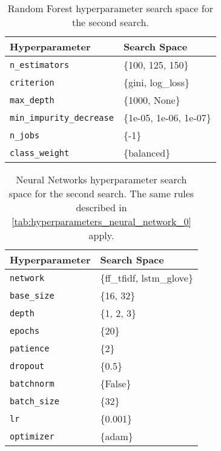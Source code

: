\begin{table}[H]
\centering
\capstart
\begin{tabularx}{0.48\textwidth}{|l|X|}
\hline
Hyperparameter & Search Space \\
\hline
\texttt{n\_estimators} & \{100, 125, 150\} \\
\texttt{criterion} & \{gini, log\_loss\} \\
\texttt{max\_depth} & \{1000, None\} \\
\texttt{min\_impurity\_decrease} & \{1e-05, 1e-06, 1e-07\} \\
\texttt{n\_jobs} & \{-1\} \\
\texttt{class\_weight} & \{balanced\} \\
\hline
\end{tabularx}
\caption{Random Forest hyperparameter search space for the second search.}
\label{tab:hyperparameters_random_forest_1}

\end{table}


\begin{table}[H]
\centering
\capstart
\begin{tabularx}{0.48\textwidth}{|l|X|}
\hline
Hyperparameter & Search Space \\
\hline
\texttt{network} & \{ff\_tfidf, lstm\_glove\} \\
\texttt{base\_size} & \{16, 32\} \\
\texttt{depth} & \{1, 2, 3\} \\
\texttt{epochs} & \{20\} \\
\texttt{patience} & \{2\} \\
\texttt{dropout} & \{0.5\} \\
\texttt{batchnorm} & \{False\} \\
\texttt{batch\_size} & \{32\} \\
\texttt{lr} & \{0.001\} \\
\texttt{optimizer} & \{adam\} \\
\hline
\end{tabularx}
\caption{Neural Networks hyperparameter search space for the second search. The same rules described in \autoref{tab:hyperparameters_neural_network_0} apply.}
\label{tab:hyperparameters_neural_network_1}

\end{table}


